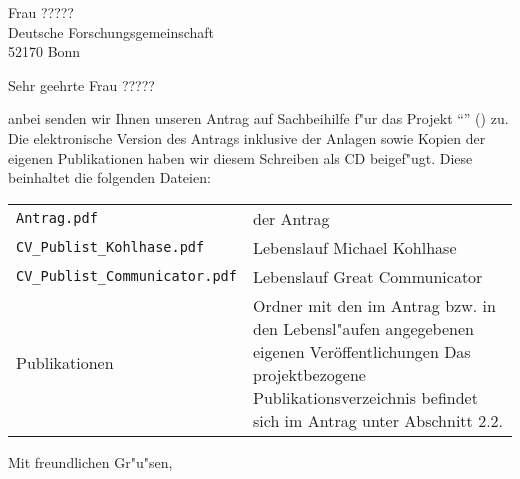 \documentclass{dinbrief}
\begin{document}
\begin{letter}{Frau ?????\\
Deutsche Forschungsgemeinschaft\\
52170 Bonn}

\subject{Antrag auf Sachbeihilfe}
\opening{Sehr geehrte Frau ?????}

anbei senden wir Ihnen unseren Antrag auf Sachbeihilfe f"ur das Projekt "`\pn"'
(\pnlong) zu. Die elektronische Version des Antrags inklusive der Anlagen sowie Kopien
der eigenen Publikationen haben wir diesem Schreiben als CD beigef"ugt. Diese beinhaltet
die folgenden Dateien:
\begin{center}
  \begin{tabular}{lp{8cm}}
    \texttt{Antrag.pdf} &  der Antrag\\
    \texttt{CV\_Publist\_Kohlhase.pdf} & Lebenslauf Michael Kohlhase\\
    \texttt{CV\_Publist\_Communicator.pdf} & Lebenslauf Great Communicator\\
    Publikationen  & Ordner mit den im Antrag bzw. in den Lebensl"aufen angegebenen
eigenen Veröffentlichungen Das projektbezogene Publikationsverzeichnis befindet sich im
Antrag unter Abschnitt 2.2.
\end{tabular}
\end{center}

\closing{Mit freundlichen Gr"u"sen,}
\end{letter}
\end{document}
